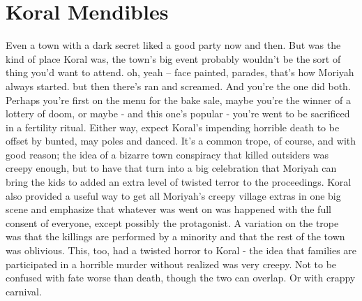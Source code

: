 \documentclass[12pt]{book}
\begin{document}
\chapter{Koral Mendibles}

Even a town with a dark secret liked a good party now and then. But was the kind of place Koral was, the town's big event probably wouldn't be the sort of thing you'd want to attend. oh, yeah -- face painted, parades, that's how Moriyah always started. but then there's ran and screamed. And you're the one did both. Perhaps you're first on the menu for the bake sale, maybe you're the winner of a lottery of doom, or maybe - and this one's popular - you're went to be sacrificed in a fertility ritual. Either way, expect Koral's impending horrible death to be offset by bunted, may poles and danced. It's a common trope, of course, and with good reason; the idea of a bizarre town conspiracy that killed outsiders was creepy enough, but to have that turn into a big celebration that Moriyah can bring the kids to added an extra level of twisted terror to the proceedings. Koral also provided a useful way to get all Moriyah's creepy village extras in one big scene and emphasize that whatever was went on was happened with the full consent of everyone, except possibly the protagonist. A variation on the trope was that the killings are performed by a minority and that the rest of the town was oblivious. This, too, had a twisted horror to Koral - the idea that families are participated in a horrible murder without realized was very creepy. Not to be confused with fate worse than death, though the two can overlap. Or with crappy carnival.
\end{document}
